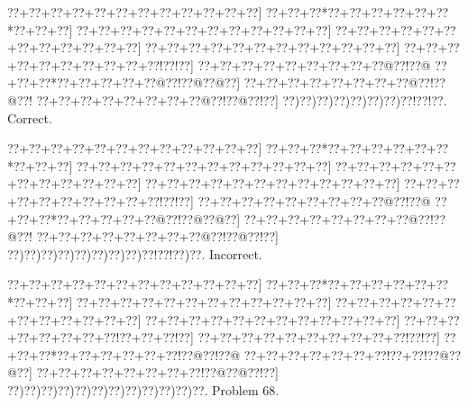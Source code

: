 \documentclass[a5paper]{article}
\begin{document}
\begin{center}
{\goo
\0??+\0??+\0??+\0??+\0??+\0??+\0??+\0??+\0??+\0??+\0??+\0??]
\0??+\0??+\0??*\0??+\0??+\0??+\0??+\0??+\0??*\0??+\0??+\0??]
\0??+\0??+\0??+\0??+\0??+\0??+\0??+\0??+\0??+\0??+\0??+\0??]
\0??+\0??+\0??+\0??+\0??+\0??+\0??+\0??+\0??+\0??+\0??+\0??]
\0??+\0??+\0??+\0??+\0??+\0??+\0??+\0??+\0??+\0??+\0??+\0??]
\0??+\0??+\0??+\0??+\0??+\0??+\0??+\0??+\0??+\0??!\0??!\0??]
\0??+\0??+\0??+\0??+\0??+\0??+\0??+\0??+\0??@\0??!\0??@
\0??+\0??+\0??*\0??+\0??+\0??+\0??+\0??@\0??!\0??@\0??@\0??]
\0??+\0??+\0??+\0??+\0??+\0??+\0??+\0??@\0??!\0??@\0??!
\0??+\0??+\0??+\0??+\0??+\0??+\0??+\0??@\0??!\0??@\0??!\0??]
\0??)\0??)\0??)\0??)\0??)\0??)\0??)\0??!\0??!\0??.
}
Correct. 

\end{center}
\begin{center}
{\goo
\0??+\0??+\0??+\0??+\0??+\0??+\0??+\0??+\0??+\0??+\0??+\0??]
\0??+\0??+\0??*\0??+\0??+\0??+\0??+\0??+\0??*\0??+\0??+\0??]
\0??+\0??+\0??+\0??+\0??+\0??+\0??+\0??+\0??+\0??+\0??+\0??]
\0??+\0??+\0??+\0??+\0??+\0??+\0??+\0??+\0??+\0??+\0??+\0??]
\0??+\0??+\0??+\0??+\0??+\0??+\0??+\0??+\0??+\0??+\0??+\0??]
\0??+\0??+\0??+\0??+\0??+\0??+\0??+\0??+\0??+\0??!\0??!\0??]
\0??+\0??+\0??+\0??+\0??+\0??+\0??+\0??+\0??@\0??!\0??@
\0??+\0??+\0??*\0??+\0??+\0??+\0??+\0??@\0??!\0??@\0??@\0??]
\0??+\0??+\0??+\0??+\0??+\0??+\0??+\0??@\0??!\0??@\0??!
\0??+\0??+\0??+\0??+\0??+\0??+\0??+\0??@\0??!\0??@\0??!\0??]
\0??)\0??)\0??)\0??)\0??)\0??)\0??)\0??)\0??!\0??!\0??)\0??.
}
Incorrect. 

\end{center}
\newpage
\begin{center}
{\goo
\0??+\0??+\0??+\0??+\0??+\0??+\0??+\0??+\0??+\0??+\0??+\0??]
\0??+\0??+\0??*\0??+\0??+\0??+\0??+\0??+\0??*\0??+\0??+\0??]
\0??+\0??+\0??+\0??+\0??+\0??+\0??+\0??+\0??+\0??+\0??+\0??]
\0??+\0??+\0??+\0??+\0??+\0??+\0??+\0??+\0??+\0??+\0??+\0??]
\0??+\0??+\0??+\0??+\0??+\0??+\0??+\0??+\0??+\0??+\0??+\0??]
\0??+\0??+\0??+\0??+\0??+\0??+\0??+\0??!\0??+\0??+\0??!\0??]
\0??+\0??+\0??+\0??+\0??+\0??+\0??+\0??+\0??+\0??!\0??!\0??]
\0??+\0??+\0??*\0??+\0??+\0??+\0??+\0??+\0??!\0??@\0??!\0??@
\0??+\0??+\0??+\0??+\0??+\0??+\0??!\0??+\0??!\0??@\0??@\0??]
\0??+\0??+\0??+\0??+\0??+\0??+\0??+\0??!\0??@\0??@\0??!\0??]
\0??)\0??)\0??)\0??)\0??)\0??)\0??)\0??)\0??)\0??)\0??)\0??.
}
Problem 68.

\end{center}
\end{document}
